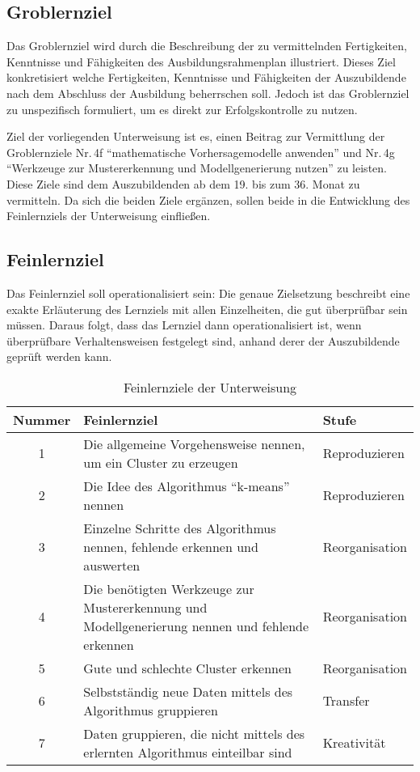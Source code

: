 \subsection{Groblernziel}
Das Groblernziel wird durch die Beschreibung der zu vermittelnden Fertigkeiten, Kenntnisse und Fähigkeiten des Ausbildungsrahmenplan illustriert. Dieses Ziel konkretisiert welche Fertigkeiten, Kenntnisse und Fähigkeiten der Auszubildende nach dem Abschluss der Ausbildung beherrschen soll. Jedoch ist das Groblernziel zu unspezifisch formuliert, um es direkt zur Erfolgskontrolle zu nutzen. 
\par
Ziel der vorliegenden Unterweisung ist es, einen Beitrag zur Vermittlung der Groblernziele Nr.\,4f \enquote{mathematische Vorhersagemodelle anwenden} und Nr.\,4g \enquote{Werkzeuge zur Mustererkennung und Modellgenerierung nutzen} zu leisten. Diese Ziele sind dem Auszubildenden ab dem 19. bis zum 36. Monat zu vermitteln. Da sich die beiden Ziele ergänzen, sollen beide in die Entwicklung des Feinlernziels der Unterweisung einfließen. 
 
\subsection{Feinlernziel}
Das Feinlernziel soll operationalisiert sein: Die genaue Zielsetzung beschreibt eine exakte Erläuterung des Lernziels mit allen Einzelheiten, die gut überprüfbar sein müssen. Daraus folgt, dass das Lernziel dann operationalisiert ist, wenn überprüfbare Verhaltensweisen festgelegt sind, anhand derer der Auszubildende geprüft werden kann. 

\begin{table}[h!]
	\centering
	
	\begin{tabular}{@{}cp{8.0cm}l@{}}
		\toprule
		\textbf{Nummer} & \textbf{Feinlernziel} & \textbf{Stufe} \\ \midrule
		1 & Die allgemeine Vorgehensweise nennen, um ein Cluster zu erzeugen & Reproduzieren\\
		2 & Die Idee des Algorithmus \enquote{k-means} nennen & Reproduzieren \\
		3 & Einzelne Schritte des Algorithmus nennen, fehlende erkennen und auswerten & Reorganisation \\
		4 & Die benötigten Werkzeuge zur Mustererkennung und Modellgenerierung nennen und fehlende erkennen & Reorganisation \\ 
		5 & Gute und schlechte Cluster erkennen & Reorganisation \\
		6 & Selbstständig neue Daten mittels des Algorithmus gruppieren & Transfer \\ 
		7 & Daten gruppieren, die nicht mittels des erlernten Algorithmus einteilbar sind & Kreativität\\ 

		\bottomrule
	\end{tabular}

	\caption{Feinlernziele der Unterweisung}
	\label{tab:lernziele}
\end{table}

